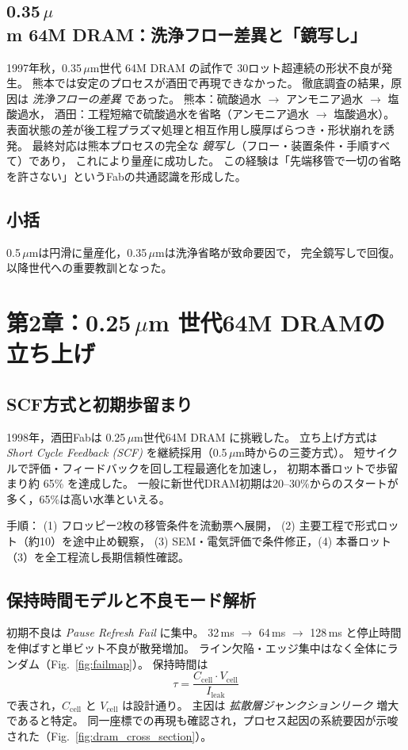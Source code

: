 \documentclass[conference]{IEEEtran}
\begin{document}
\subsection{0.35\,$\mu$m 64M DRAM：洗浄フロー差異と「鏡写し」}
1997年秋，0.35\,$\mu$m世代 64M DRAM の試作で 30ロット超連続の形状不良が発生。
熊本では安定のプロセスが酒田で再現できなかった。
徹底調査の結果，原因は \emph{洗浄フローの差異} であった。
熊本：硫酸過水 $\rightarrow$ アンモニア過水 $\rightarrow$ 塩酸過水，
酒田：工程短縮で硫酸過水を省略（アンモニア過水 $\rightarrow$ 塩酸過水）。
表面状態の差が後工程プラズマ処理と相互作用し膜厚ばらつき・形状崩れを誘発。
最終対応は熊本プロセスの完全な \emph{鏡写し}（フロー・装置条件・手順すべて）であり，
これにより量産に成功した。
この経験は「先端移管で一切の省略を許さない」というFabの共通認識を形成した。

\subsection{小括}
0.5\,$\mu$mは円滑に量産化，0.35\,$\mu$mは洗浄省略が致命要因で，
完全鏡写しで回復。以降世代への重要教訓となった。

\FloatBarrier

\section{第2章：0.25\,\texorpdfstring{$\mu$m}{μm} 世代64M DRAMの立ち上げ}

\subsection{SCF方式と初期歩留まり}
1998年，酒田Fabは 0.25\,$\mu$m世代64M DRAM に挑戦した。
立ち上げ方式は \emph{Short Cycle Feedback (SCF)} を継続採用（0.5\,$\mu$m時からの三菱方式）。
短サイクルで評価・フィードバックを回し工程最適化を加速し，
初期本番ロットで歩留まり約 65\% を達成した。
一般に新世代DRAM初期は20–30\%からのスタートが多く，65\%は高い水準といえる。

手順： (1) フロッピー2枚の移管条件を流動票へ展開，
(2) 主要工程で形式ロット（約10）を途中止め観察，
(3) SEM・電気評価で条件修正，(4) 本番ロット（3）を全工程流し長期信頼性確認。

\subsection{保持時間モデルと不良モード解析}
初期不良は \emph{Pause Refresh Fail} に集中。
32\,ms $\rightarrow$ 64\,ms $\rightarrow$ 128\,ms と停止時間を伸ばすと単ビット不良が散発増加。
ライン欠陥・エッジ集中はなく全体にランダム（Fig.~\ref{fig:failmap}）。
保持時間は
\begin{equation}
\tau = \frac{C_{\mathrm{cell}} \cdot V_{\mathrm{cell}}}{I_{\mathrm{leak}}}
\end{equation}
で表され，$C_{\mathrm{cell}}$ と $V_{\mathrm{cell}}$ は設計通り。
主因は \emph{拡散層ジャンクションリーク} 増大であると特定。
同一座標での再現も確認され，プロセス起因の系統要因が示唆された（Fig.~\ref{fig:dram_cross_section}）。
\end{document}
